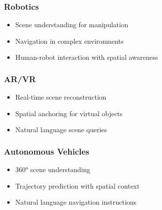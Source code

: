\subsubsection{Robotics}
\begin{itemize}
    \item Scene understanding for manipulation
    \item Navigation in complex environments
    \item Human-robot interaction with spatial awareness
\end{itemize}

\subsubsection{AR/VR}
\begin{itemize}
    \item Real-time scene reconstruction
    \item Spatial anchoring for virtual objects
    \item Natural language scene queries
\end{itemize}

\subsubsection{Autonomous Vehicles}
\begin{itemize}
    \item 360° scene understanding
    \item Trajectory prediction with spatial context
    \item Natural language navigation instructions
\end{itemize}